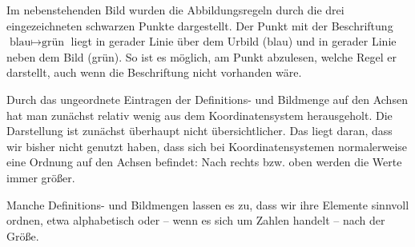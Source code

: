 \documentclass[../../main.tex]{subfiles}
\begin{document}
\begin{example}{}
    
    Im nebenstehenden Bild wurden die Abbildungsregeln durch die drei eingezeichneten schwarzen Punkte dargestellt. Der Punkt mit der Beschriftung $\text{blau}\mapsto\text{grün}$ liegt in gerader Linie über dem Urbild (blau) und in gerader Linie neben dem Bild (grün). So ist es möglich, am Punkt abzulesen, welche Regel er darstellt, auch wenn die Beschriftung nicht vorhanden wäre.
\end{example}

Durch das ungeordnete Eintragen der Definitions- und Bildmenge auf den Achsen hat man zunächst relativ wenig aus dem Koordinatensystem herausgeholt. Die Darstellung ist zunächst überhaupt nicht übersichtlicher. Das liegt daran, dass wir bisher nicht genutzt haben, dass sich bei Koordinatensystemen normalerweise eine Ordnung auf den Achsen befindet: Nach rechts bzw. oben werden die Werte immer größer.

Manche Definitions- und Bildmengen lassen es zu, dass wir ihre Elemente sinnvoll ordnen, etwa alphabetisch oder -- wenn es sich um Zahlen handelt -- nach der Größe.
\end{document}
